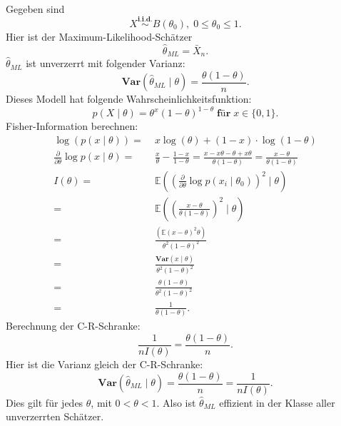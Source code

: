 \documentclass[10pt]{article}
\newcommand{\EW}{\mathbb{E}} %
\newcommand{\ablt}{\frac{\partial}{\partial \theta}}
\newcommand{\Var}{\textbf{Var}} %
\newenvironment{BSP}[1][]
{\begin{Beispiel}[frametitle=#1]}{\end{Beispiel}}
\begin{document}
	\begin{BSP}[Beispiel 1.4.2 (Anwendung C-R-Schranke Bernoulli-Verteilung)]
		Gegeben sind
		\begin{equation*}
			X \overset{\textbf{i.i.d.}}{\sim} B(\theta_0), \; 0 \leq \theta_0 \leq 1.
		\end{equation*}
		Hier ist der Maximum-Likelihood-Schätzer
		\begin{equation*}
			\hat{\theta}_{ML} = \bar{X}_n.
		\end{equation*}
		$\hat{\theta}_{ML}$ ist unverzerrt mit folgender Varianz:
		\begin{equation*}
			\textbf{Var}(\hat{\theta}_{ML} \mid \theta) = \frac{\theta (1-\theta)}{n}.
		\end{equation*}
		Dieses Modell hat folgende Wahrscheinlichkeitsfunktion:
		\begin{equation*}
			p (X \mid \theta) = \theta^x(1-\theta)^{1-\theta} \; \textbf{für} \; x \in \{0,1\}.
		\end{equation*}
		Fisher-Information berechnen:
		\begin{equation*}
			\begin{split}
				\log(p(x \mid \theta)) =& \; x \log (\theta) +(1-x) \cdot \log(1-\theta)\\
				\ablt \log p(x \mid \theta) =& \; \frac{x}{\theta} - \frac{1-x}{1-\theta} = \frac{x-x\theta-\theta+x\theta}{\theta (1-\theta)} = \frac{x-\theta}{\theta (1-\theta)}\\
				I(\theta) =& \; \EW \left(\left(\ablt \log p(x_i \mid \theta_0)\right)^2 \mid \theta\right)\\
				=& \; \EW \left(\left(\frac{x-\theta}{\theta(1-\theta)}\right)^2 \mid \theta \right)\\
				=& \; \frac{(\EW(x-\theta)^2 \theta)}{\theta^2 (1-\theta)^2}\\
				=& \; \frac{\textbf{Var}(x\mid \theta)}{\theta^2 (1-\theta)^2}\\ 
				=& \; \frac{\theta(1-\theta)}{\theta^2 (1-\theta)^2}\\
				=& \; \frac{1}{\theta(1-\theta)}.
			\end{split}
		\end{equation*}
		Berechnung der C-R-Schranke:
		\begin{equation*}
			\frac{1}{nI(\theta)} = \frac{\theta(1-\theta)}{n}.
		\end{equation*}
		Hier ist die Varianz gleich der C-R-Schranke:
		\begin{equation*}
			\Var(\hat{\theta}_{ML} \mid \theta) = \frac{\theta(1-\theta)}{n} = \frac{1}{nI(\theta)}.
		\end{equation*}
		Dies gilt für jedes $\theta$, mit $0< \theta <1$. 
		Also ist $\hat{\theta}_{ML}$ effizient in der Klasse aller unverzerrten Schätzer. 
	\end{BSP}
	
\end{document}
